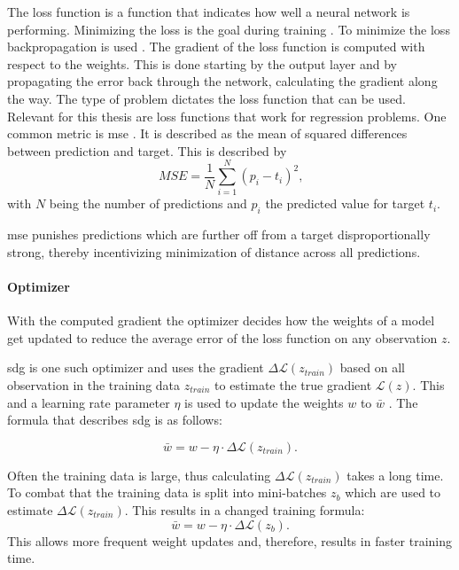 The loss function is a function that indicates how well a neural network is performing. Minimizing the loss is the goal during training \cite{teuwen2020convolutional}. To minimize the loss backpropagation is used \cite{nielsen2015neural}. The gradient of the loss function is computed with respect to the weights. This is done starting by the output layer and by propagating the error back through the network, calculating the gradient along the way. The type of problem dictates the loss function that can be used. Relevant for this thesis are loss functions that work for regression problems. One common metric is \ac{mse} \cite{goodfellow2016deep}. It is described as the mean of squared differences between prediction and target. This is described by $$ MSE = \frac{1}{N} \sum_{i=1}^N (p_i - t_i)^2 \text{,}$$ with $N$ being the number of predictions and $p_i$ the predicted value for target $t_i$.

\Ac{mse} punishes predictions which are further off from a target disproportionally strong, thereby incentivizing minimization of distance across all predictions.


\paragraph{Optimizer}
\label{par:Foundations:NeuralNetworks:Training:Optimizer}

With the computed gradient the optimizer decides how the weights of a model get updated to reduce the average error of the loss function on any observation $z$.

\Ac{sdg} is one such optimizer and uses the gradient $\Delta \mathcal{L}(z_{train})$ based on all observation in the training data $z_{train}$ to estimate the true gradient $\mathcal{L}(z)$. This and a learning rate parameter $\eta$ is used to update the weights $w$ to $\bar{w}$ \cite{murphy2022probabilistic}. The formula that describes \ac{sdg} is as follows:

$$ \bar{w} = w - \eta \cdot \Delta \mathcal{L}(z_{train}).$$

Often the training data is large, thus calculating $\Delta \mathcal{L}(z_{train})$ takes a long time. To combat that the training data is split into mini-batches $z_{b}$ which are used to estimate $\Delta \mathcal{L}(z_{train})$. This results in a changed training formula:
$$ \bar{w} = w - \eta \cdot \Delta \mathcal{L}(z_{b}).$$ This allows more frequent weight updates and, therefore, results in faster training time.


